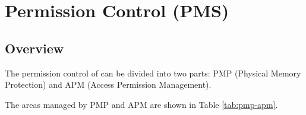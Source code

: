 \documentclass[main\_\_EN.tex]{subfiles}
\begin{document}

\ifglobal
\else
    {\let\clearpage\relax \listoftodos}
    {\let\clearpage\relax \listofdonetodos}
    \tableofcontents
\fi



\hypertarget{permctrl}{}
\chapter{Permission Control (PMS)}
\label{mod:permctrl}


\section{Overview}

The permission control of \chipname{} can be divided into two parts: PMP (Physical Memory Protection) and APM (Access Permission Management).

The areas managed by PMP and APM are shown in Table \ref{tab:pmp-apm}.
\end{document}

